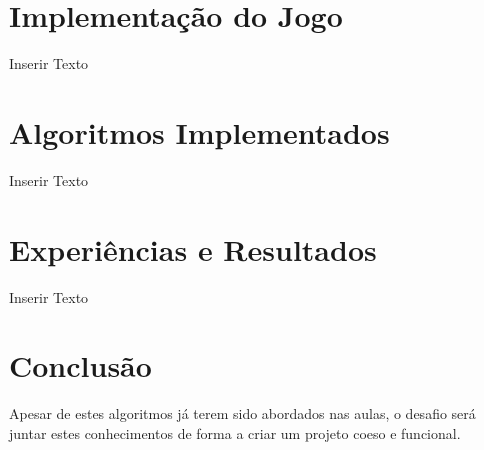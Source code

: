 \documentclass[conference]{IEEEtran}
\begin{document}
\section{Implementa\c c\~ao do Jogo}
Inserir Texto

\section{Algoritmos Implementados}
Inserir Texto

\section{Experiências e Resultados}
Inserir Texto

\section{Conclus\~ao}

Apesar de estes algoritmos j\'a terem sido abordados nas aulas, o desafio ser\'a juntar estes conhecimentos de forma a criar um projeto coeso e funcional.



\end{document}
